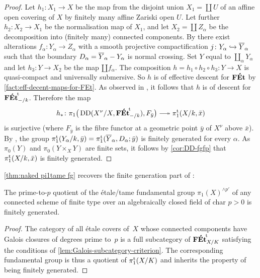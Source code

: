 \begin{proof}
Let $h_1 \colon X_1 \to X$ be the map from the disjoint union $X_1 = \coprod U$ of an affine open covering of $X$ by finitely many affine Zariski open $U$. 
Let further $h_2\colon X_2 \to X_1$ be the normalisation map of $X_1$, and let $X_2 = \coprod Z_\alpha$ be the decomposition into (finitely many) connected components. 
By \cite[Theorem~4.1]{deJong1996:SmoothnessSemistabilityAlterations} there exist  alterations $f_\alpha\colon  Y_\alpha \to Z_\alpha$ with a smooth projective compactification
$j\colon  Y_\alpha \hookrightarrow \overline{Y}_\alpha$ such that the boundary $D_\alpha = \overline{Y}_\alpha - Y_\alpha$ is normal crossing. 
Set $Y$ equal to $\coprod_\alpha Y_\alpha$ and let $h_3: Y \to X_2$ be the map $\amalg f_\alpha$. 
The composition $h = h_1\circ  h_2 \circ h_3 \colon Y \to X$ is quasi-compact and universally submersive. So $h$ is of effective descent for $\mathbf{F\acute{E}t}$ by \cref{fact:eff-decent-maps-for-FEt}.
As observed in , it follows that $h$ is of  descent for ${\mathbf{F\acute{E}t}}^{\!\mathrm{t}}_{-/k}$.
Therefore the map
\[
h_\ast\colon  \pi_1\big(\Desc(X^\nu/X,\FEtt_{-/k}), F_{\bar y}\big) \surj \pitame(X/k,\bar x)
\]
is surjective (where $F_{\bar y}$ is the fibre functor at a geometric point $\bar y$ of $X^\nu$ above $\bar x$). 
By \cite[Proposition~3.2]{EsnaultShustermanSrinivas2022:FinitePresentationTame}, the group $\pi_1^{\mathrm{t}}(Y_\alpha/k,\bar y) = \pi_1^{\mathrm{t}}(\overline{Y}_\alpha,D_\alpha; \bar y)$ is finitely generated for every $\alpha$.  
As $\pi_0(Y)$ and $\pi_0(Y \times_X Y)$ are finite sets,
it follows by \cref{cor:DD-fgfp} 
that $\pi_1^{\mathrm{t}}(X/k,\bar x)$ is finitely generated. 
\end{proof}

\cref{thm:naked pi1tame fg} recovers the finite generation part of \cite[Th\'eor\`eme~4.11]{Orgogozo2003:AlterationsGroupeFondamental}:

\begin{cor}
    The prime-to-$p$ quotient of the \'etale/tame fundamental group $\pi_1(X)^{\wedge p'}$ of any connected scheme of finite type over an algebraically closed field of char $p>0$ is finitely generated.
\end{cor}

\begin{proof}
    The category of all étale covers of~$X$ whose connected components have Galois closures of degrees prime to~$p$ is a full subcategory of ${\mathbf{F\acute{E}t}}^{\!\mathrm{t}}_{X/K}$ satisfying the conditions of \cref{lem:Galois-subcategory-criterion}.
    The corresponding fundamental group is thus a quotient of $\pi_1^{\mathrm{t}}(X/K)$ and inherits the property of being finitely generated.
\end{proof}

